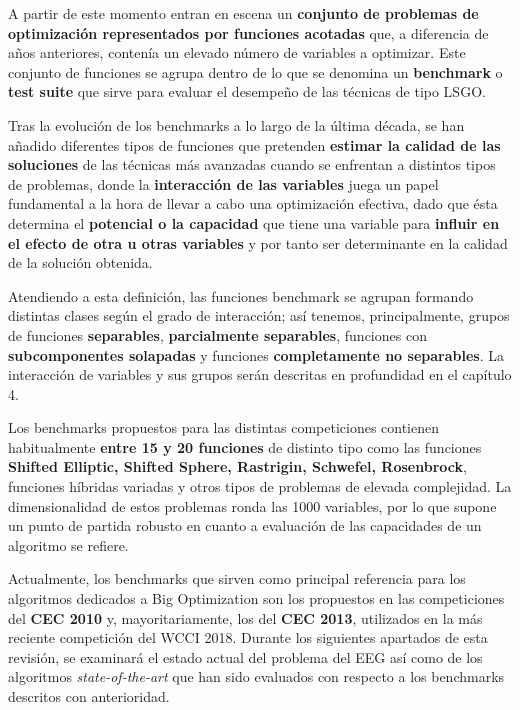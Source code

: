 A partir de este momento entran en escena un \textbf{conjunto de problemas de optimización representados por funciones acotadas} que, a diferencia de años anteriores, contenía un elevado número de variables a optimizar. Este conjunto de funciones se agrupa dentro de lo que se denomina un \textbf{benchmark} o \textbf{test suite} que sirve para evaluar el desempeño de las técnicas de tipo LSGO.

Tras la evolución de los benchmarks a lo largo de la última década, se han añadido diferentes tipos de funciones que pretenden \textbf{estimar la calidad de las soluciones} de las técnicas más avanzadas cuando se enfrentan a distintos tipos de problemas, donde la \textbf{interacción de las variables} juega un papel fundamental a la hora de llevar a cabo una optimización efectiva, dado que ésta determina el \textbf{potencial o la capacidad} que tiene una variable para  \textbf{influir en el efecto de otra u otras variables} y por tanto ser determinante en la calidad de la solución obtenida.

Atendiendo a esta definición\cite{ELSGOI}, las funciones benchmark se agrupan formando distintas clases según el grado de interacción; así tenemos, principalmente, grupos de funciones \textbf{separables}, \textbf{parcialmente separables}, funciones con \textbf{subcomponentes solapadas} y funciones \textbf{completamente no separables}. La interacción de variables y sus grupos serán descritas en profundidad en el capítulo 4.

Los benchmarks propuestos para las distintas competiciones contienen habitualmente \textbf{entre 15 y 20 funciones} de distinto tipo como las funciones \textbf{Shifted Elliptic, Shifted Sphere, Rastrigin, Schwefel, Rosenbrock}, funciones híbridas variadas y otros tipos de problemas de elevada complejidad\cite{ComprehensiveComparison}. La dimensionalidad de estos problemas ronda las 1000 variables, por lo que supone un punto de partida robusto en cuanto a evaluación de las capacidades  de un algoritmo se refiere.

Actualmente, los benchmarks que sirven como principal referencia para los algoritmos dedicados a Big Optimization son los propuestos en las competiciones del \textbf{CEC 2010} y, mayoritariamente, los del \textbf{CEC 2013}\cite{CEC2013}, utilizados en la más reciente competición del WCCI 2018\cite{WCCI-SHADEILS}. Durante los siguientes apartados de esta revisión, se examinará el estado actual del problema del EEG así como de los algoritmos \textit{state-of-the-art} que han sido evaluados con respecto a los benchmarks descritos con anterioridad.


